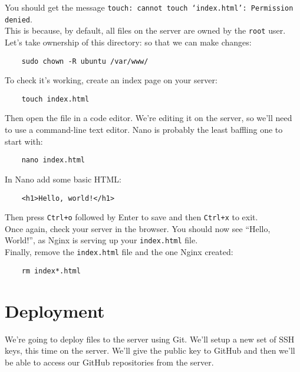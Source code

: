 You should get the message \texttt{touch: cannot touch `index.html': Permission denied}.
\\

This is because, by default, all files on the server are owned by the \texttt{root} user.
\\

Let's take ownership of this directory: so that we can make changes:

\begin{verbatim}
    sudo chown -R ubuntu /var/www/
\end{verbatim}

To check it's working, create an index page on your server:

\begin{verbatim}
    touch index.html
\end{verbatim}

Then open the file in a code editor. We're editing it on the server, so we'll need to use a command-line text editor. Nano is probably the least baffling one to start with:

\begin{verbatim}
    nano index.html
\end{verbatim}

In Nano add some basic HTML:

\begin{verbatim}
    <h1>Hello, world!</h1>
\end{verbatim}

Then press \texttt{Ctrl+o} followed by Enter to save and then \texttt{Ctrl+x} to exit.
\\

Once again, check your server in the browser. You should now see ``Hello, World!'', as Nginx is serving up your \texttt{index.html} file.
\\

Finally, remove the \texttt{index.html} file and the one Nginx created:

\begin{verbatim}
    rm index*.html
\end{verbatim}


\section{Deployment}

We're going to deploy files to the server using Git. We'll setup a new set of SSH keys, this time on the server. We'll give the public key to GitHub and then we'll be able to access our GitHub repositories from the server.


